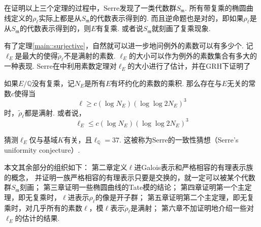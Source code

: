 在证明以上三个定理的过程中，Serre发现了一类代数群$S_{\mathfrak{m}}$. 所有带复乘的椭圆曲线定义的$\rho_{\ell}$实际上都是从$S_{\mathfrak{m}}$的代数表示得到的. 而且逆命题也是对的，即如果$\rho_{\ell}$是从$S_{\mathfrak{m}}$的代数表示得到的，则$E$有复乘. 或者说$S_{\mathfrak{m}}$就刻画了复乘现象.

有了定理\ref{main::surjective}，自然就可以进一步地问例外的素数可以有多少个.
记$\ell_{E}$是最大的使得$\tilde{\rho}_{\ell}$不是满射的素数.
$\ell_{E}$的大小可以作为例外的素数集合有多大的一种表现.
Serre在\parencite{serre1981quelques}中利用素数定理对$\ell_{E}$的大小进行了估计，并在GRH下证明了
\begin{cthm}
    如果$E/\mathbb{Q}$没有复乘，记$N_E$是所有$E$有坏约化的素数的乘积. 那么存在与$E$无关的常数$c$使得当
    \begin{equation}
        \ell \geq c(\log N_E)(\log\log 2N_E)^3
    \end{equation}
    时，$\tilde{\rho}_{\ell}$都是满射. 或者说，
    \begin{equation}
        \ell_{E} \leq c(\log N_E)(\log \log 2N_E)^3
    \end{equation}
\end{cthm}

猜测$\ell_{E}$仅与基域$K$有关，且$\ell_{\mathbb{Q}}=37$.
这被称为Serre的一致性猜想（Serre's uniformity conjecture）.

本文其余部分的组织如下：
第二章定义$\ell$进Galois表示和严格相容的有理表示族的概念，
并证明一族严格相容的有理表示只要是交换的，就一定可以被某个代数群$S_{\mathfrak{m}}$刻画；
第三章证明一些椭圆曲线的Tate模的结论；
第四章证明第一个主定理，即无复乘时，$\ell$进表示$\rho_{\ell}$的像是开子群；
第五章证明第二个主定理，即无复乘时，对几乎所有的素数$\ell$，模$\ell$表示$\tilde{\rho}_{\ell}$是满射；
第六章不加证明地介绍一些对$\ell_{E}$的估计的结果.
